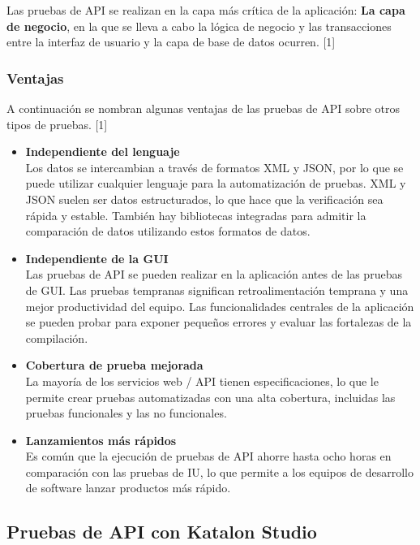 \documentclass[twoside,twocolumn]{article}
\begin{document}
Las pruebas de API se realizan en la capa más crítica de la aplicación: \textbf{La capa de negocio}, en la que se lleva a cabo la lógica de negocio y las transacciones entre la interfaz de usuario y la capa de base de datos ocurren. [1]

\subsubsection{Ventajas}

A continuación se nombran algunas ventajas de las pruebas de API sobre otros tipos de pruebas. [1]

\begin{itemize}
  \item \textbf{Independiente del lenguaje} \\
  Los datos se intercambian a través de formatos XML y JSON, por lo que se puede utilizar cualquier lenguaje para la automatización de pruebas. XML y JSON suelen ser datos estructurados, lo que hace que la verificación sea rápida y estable. También hay bibliotecas integradas para admitir la comparación de datos utilizando estos formatos de datos.
  \item \textbf{Independiente de la GUI} \\
  Las pruebas de API se pueden realizar en la aplicación antes de las pruebas de GUI. Las pruebas tempranas significan retroalimentación temprana y una mejor productividad del equipo. Las funcionalidades centrales de la aplicación se pueden probar para exponer pequeños errores y evaluar las fortalezas de la compilación.
  \item \textbf{Cobertura de prueba mejorada} \\
  La mayoría de los servicios web / API tienen especificaciones, lo que le permite crear pruebas automatizadas con una alta cobertura, incluidas las pruebas funcionales y las no funcionales.
  \item \textbf{Lanzamientos más rápidos} \\
  Es común que la ejecución de pruebas de API ahorre hasta ocho horas en comparación con las pruebas de IU, lo que permite a los equipos de desarrollo de software lanzar productos más rápido.
\end{itemize}

\subsection{Pruebas de API con Katalon Studio}
\end{document}
